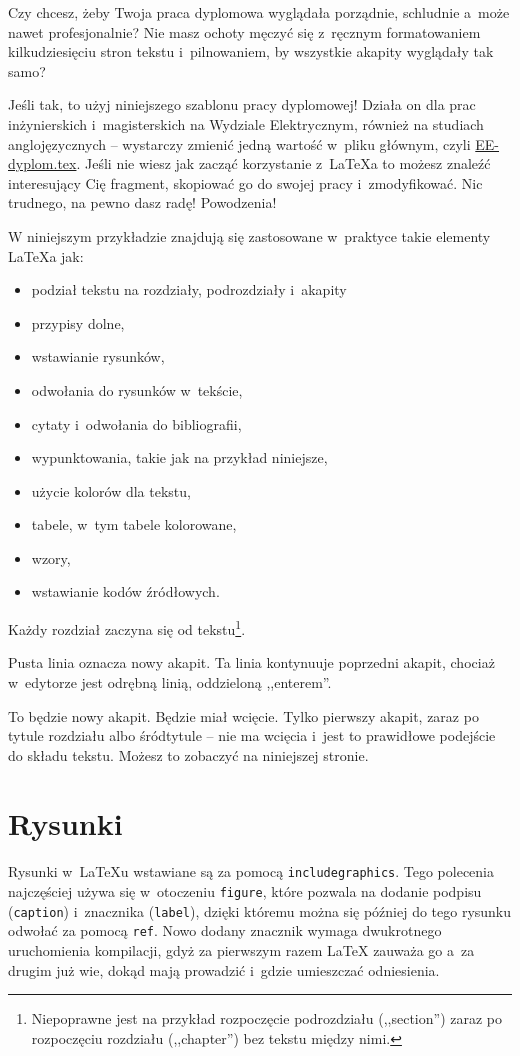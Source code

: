 Czy chcesz, żeby Twoja praca dyplomowa wyglądała porządnie, schludnie a~może nawet profesjonalnie? Nie masz ochoty męczyć się z~ręcznym formatowaniem kilkudziesięciu stron tekstu i~pilnowaniem, by wszystkie akapity wyglądały tak samo?

Jeśli tak, to użyj niniejszego szablonu pracy dyplomowej! Działa on dla prac inżynierskich i~magisterskich na Wydziale Elektrycznym, również na studiach anglojęzycznych -- wystarczy zmienić jedną wartość w~pliku głównym, czyli \href{./EE-dyplom.tex}{EE-dyplom.tex}. Jeśli nie wiesz jak zacząć korzystanie z~\LaTeX{a} to możesz znaleźć interesujący Cię fragment, skopiować go do swojej pracy i~zmodyfikować. Nic trudnego, na pewno dasz radę! Powodzenia!

W niniejszym przykładzie znajdują się zastosowane w~praktyce takie elementy \LaTeX{a} jak:
\begin{itemize}
    \item podział tekstu na rozdziały, podrozdziały i~akapity
    \item przypisy dolne,
    \item wstawianie rysunków,
    \item odwołania do rysunków w~tekście,
    \item cytaty i~odwołania do bibliografii,
    \item wypunktowania, takie jak na przykład niniejsze,
    \item użycie kolorów dla tekstu,
    \item tabele, w~tym tabele kolorowane, %
    \item wzory, %
    \item wstawianie kodów źródłowych.
\end{itemize}

Każdy rozdział zaczyna się od tekstu\footnote{Niepoprawne jest na przykład rozpoczęcie podrozdziału (,,section'') zaraz po rozpoczęciu rozdziału (,,chapter'') bez tekstu między nimi.}.

Pusta linia oznacza nowy akapit.
Ta linia kontynuuje poprzedni akapit, chociaż w~edytorze jest odrębną linią, oddzieloną ,,enterem''.

To będzie nowy akapit. Będzie miał wcięcie. Tylko pierwszy akapit, zaraz po tytule rozdziału albo śródtytule -- nie ma wcięcia i~jest to prawidłowe podejście do składu tekstu. Możesz to zobaczyć na niniejszej stronie.

\section{Rysunki}
Rysunki w~\LaTeX{u} wstawiane są za pomocą \texttt{includegraphics}. Tego polecenia najczęściej używa się w~otoczeniu \texttt{figure}, które pozwala na dodanie podpisu (\texttt{caption}) i~znacznika (\texttt{label}), dzięki któremu można się później do tego rysunku odwołać za pomocą \texttt{ref}. Nowo dodany znacznik wymaga dwukrotnego uruchomienia kompilacji, gdyż za pierwszym razem \LaTeX{} zauważa go a~za drugim już wie, dokąd mają prowadzić i~gdzie umieszczać odniesienia.


